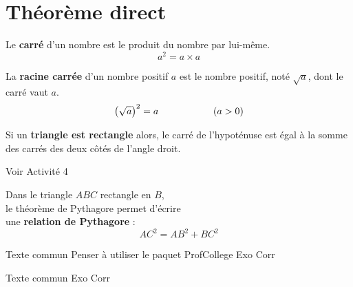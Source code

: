 \section{Théorème direct}

\begin{definition}
    Le {\bfseries carré}  d'un nombre est le produit du nombre par lui-même.
    $$a^2=a\times a$$
\end{definition}

\begin{definition}
    La {\bfseries racine carrée} d'un nombre positif $a$ est le nombre positif, noté $\sqrt{a}$, dont le carré vaut $a$.
    $$\left(\sqrt{a}\right)^2=a\kern20mm(a>0)$$
\end{definition}

\begin{propriete}
    Si un \textbf{triangle est rectangle} alors, le carré de l'hypoténuse est égal à la somme des carrés des deux côtés de l'angle droit.
\end{propriete}

\begin{preuve}
    Voir Activité 4
\end{preuve}

\begin{propriete}
    \begin{minipage}{0.5\linewidth}
    \end{minipage}
    \begin{minipage}{0.5\linewidth}
        Dans le triangle $ABC$ rectangle en $B$,\\le théorème de Pythagore permet d'écrire\\ une \textbf{relation de Pythagore} :
        $$AC^2=AB^2+BC^2$$
    \end{minipage}
\end{propriete}

\begin{methode*1}
    Texte commun Penser à utiliser le paquet ProfCollege
    \exercice
    Exo
    \correction
    Corr
\end{methode*1}

\begin{methode*1}
    Texte commun
    \exercice
    Exo
    \correction
    Corr
\end{methode*1}
